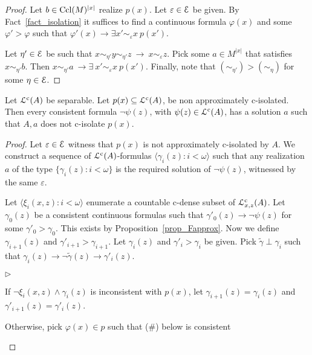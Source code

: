 \documentclass{amsproc}
\newcommand{\mylabel}[1]{{#1}\hfill}
\renewenvironment{itemize}
  {\begin{list}{$\triangleright$}{%
  \setlength{\parskip}{0mm}
  \setlength{\topsep}{.4\baselineskip}
  \setlength{\rightmargin}{0mm}
  \setlength{\listparindent}{0mm}
  \setlength{\itemindent}{0mm}
  \setlength{\labelwidth}{3ex}
  \setlength{\itemsep}{.2\baselineskip}
  \setlength{\parsep}{.2\baselineskip}
  \setlength{\partopsep}{0mm}
  \setlength{\labelsep}{1ex}
  \setlength{\leftmargin}{\labelwidth+\labelsep}
  \let\makelabel\mylabel}}{%
\end{list}}
\begin{document}
{\begin{proof}
  Let $b\in{\rm Ccl}(M)^{|x|}$ realize $p(x)$.
  Let $\varepsilon\in{\EuScript E}$ be given.
  By Fact~\ref{fact_isolation} it suffices to find a continuous formula $\varphi(x)$ and some $\varphi'>\varphi$ such that $\varphi'(x)\rightarrow\exists x'\sim_\varepsilon\! x\ p(x')$.

  Let $\eta'\in{\EuScript E}$ be such that $x\sim_{\eta'} y\sim_{\eta'} z\ \rightarrow\ x\sim_\varepsilon\! z$.
  Pick some $a\in M^{|x|}$ that satisfies $x\sim_{\eta'} b$.
  Then $x\sim_{\eta'}a\ \rightarrow\exists\ x'\sim_\varepsilon\! x\ p(x')$.
  Finally, note that $(\sim_{\eta'})>(\sim_\eta)$ for some $\eta\in{\EuScript E}$.
\end{proof}

\begin{lemma}\label{lem_kuratowskiUlam_cont}
  Let ${\EuScript L}^{\rm c}(A)$ be separable.
  Let $p(x)\subseteq{\EuScript L}^{\rm c}(A)$, be non approximately c-isolated.
  Then every consistent formula $\neg\psi(z)$, with $\psi(z)\in{\EuScript L}^{\rm c}(A)$, has a solution $a$ such that $A,a$ does not c-isolate $p(x)$.
\end{lemma}

\begin{proof}
  Let $\varepsilon\in{\EuScript E}$ witness that $p(x)$ is not approximately c-isolated by $A$. 
  We construct a sequence of ${\EuScript L}^{\rm c}(A)$-formulas $\langle\gamma_i(z):i<\omega\rangle$ such that any realization $a$ of the type $\big\{\gamma_i(z):i<\omega\big\}$ is the required solution of $\neg\psi(z)$, witnessed by the same $\varepsilon$.
  
  Let $\langle\xi_i(x,z):i<\omega\rangle$ enumerate a countable c-dense subset of ${\EuScript L}^{\rm c}_{x,z}(A)$.
  Let $\gamma_0(z)$ be a consistent continuous formulas such that $\gamma'_0(z)\rightarrow\neg\psi(z)$ for some $\gamma'_0>\gamma_0$.
  This exists by Proposition~\ref{prop_Fapprox}.
  Now we define $\gamma_{i+1}(z)$ and $\gamma'_{i+1}>\gamma_{i+1}$.
  Let $\gamma_i(z)$ and $\gamma'_i>\gamma_i$ be given.
  Pick $\tilde{\gamma}\perp\gamma_i$ such that $\gamma_i(z)\rightarrow\neg\tilde{\gamma}(z)\rightarrow\gamma'_i(z)$.
  
  \begin{itemize}
  \item[1.] If $\neg\xi_i(x,z)\wedge\gamma_i(z)$ is inconsistent with $p(x)$, let $\gamma_{i+1}(z)=\gamma_i(z)$ and  $\gamma'_{i+1}(z)=\gamma'_i(z)$.
  \item[2.] Otherwise, pick $\varphi(x)\in p$ such that (\#) below is consistent
  

\end{itemize}
\end{proof}}
\end{document}
